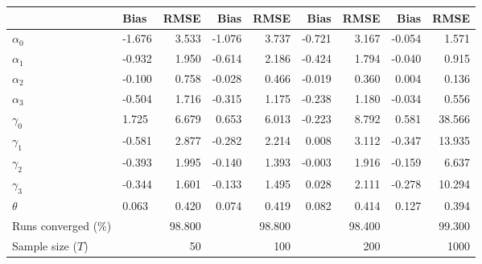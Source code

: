 
\begin{tabular}[t]{llrrrrrrr}
\toprule
  & Bias & RMSE & Bias & RMSE & Bias & RMSE & Bias & RMSE\\
\midrule
$\alpha_{0}$ & -1.676 & 3.533 & -1.076 & 3.737 & -0.721 & 3.167 & -0.054 & 1.571\\
$\alpha_{1}$ & -0.932 & 1.950 & -0.614 & 2.186 & -0.424 & 1.794 & -0.040 & 0.915\\
$\alpha_{2}$ & -0.100 & 0.758 & -0.028 & 0.466 & -0.019 & 0.360 & 0.004 & 0.136\\
$\alpha_{3}$ & -0.504 & 1.716 & -0.315 & 1.175 & -0.238 & 1.180 & -0.034 & 0.556\\
$\gamma_{0}$ & 1.725 & 6.679 & 0.653 & 6.013 & -0.223 & 8.792 & 0.581 & 38.566\\
$\gamma_{1}$ & -0.581 & 2.877 & -0.282 & 2.214 & 0.008 & 3.112 & -0.347 & 13.935\\
$\gamma_{2}$ & -0.393 & 1.995 & -0.140 & 1.393 & -0.003 & 1.916 & -0.159 & 6.637\\
$\gamma_{3}$ & -0.344 & 1.601 & -0.133 & 1.495 & 0.028 & 2.111 & -0.278 & 10.294\\
$\theta$ & 0.063 & 0.420 & 0.074 & 0.419 & 0.082 & 0.414 & 0.127 & 0.394\\
Runs converged (\%) &  & 98.800 &  & 98.800 &  & 98.400 &  & 99.300\\
Sample size ($T$) &  & 50 &  & 100 &  & 200 &  & 1000\\
\bottomrule
\end{tabular}
